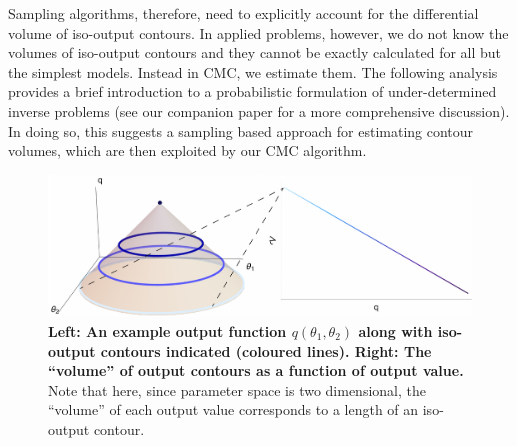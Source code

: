 Sampling algorithms, therefore, need to explicitly account for the differential volume of iso-output contours. In applied problems, however, we do not know the volumes of iso-output contours and they cannot be exactly calculated for all but the simplest models. Instead in CMC, we estimate them. The following analysis provides a brief introduction to a probabilistic formulation of under-determined inverse problems (see our companion paper \cite{lambert2018inverse} for a more comprehensive discussion). In doing so, this suggests a sampling based approach for estimating contour volumes, which are then exploited by our CMC algorithm.

\begin{figure}[H]
	\centerline{\includegraphics[width=\textwidth]{../figures/contour_volumes_redux.pdf}}
	\caption{\textbf{Left: An example output function $q(\theta_1,\theta_2)$ along with iso-output contours indicated (coloured lines). Right: The ``volume'' of output contours as a function of output value.} Note that here, since parameter space is two dimensional, the ``volume'' of each output value corresponds to a length of an iso-output contour.}
	\label{fig:contour_volumes}
\end{figure}

